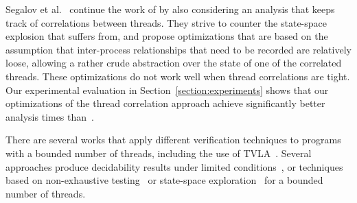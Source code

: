 Segalov et al.~\cite{Sagiv:correlation} continue the work of \cite{BLMRS:cav08}
by also considering an analysis that keeps track of correlations between threads.
They strive to counter the state-space explosion that \cite{BLMRS:cav08} suffers from,
and propose optimizations that are based on the
assumption that inter-process relationships that need to be recorded
are relatively loose, allowing a rather crude abstraction over the
state of one of the correlated threads. 
These optimizations do not work well when thread correlations are tight.
Our experimental evaluation in
Section~\ref{section:experiments} shows that our optimizations of the
thread correlation approach achieve significantly better analysis
times than~\cite{Sagiv:correlation}.

There are several works that apply different verification
techniques to programs with a bounded number of threads, including
the use of TVLA~\cite{YaSa:queue}.
Several approaches produce decidability
results under limited conditions~\cite{CernyRZCA:CAV10},
or techniques based on non-exhaustive testing~\cite{Burckhardt:PLDI10} or
state-space exploration~\cite{Vechev:spin09} for a bounded number of
threads.





